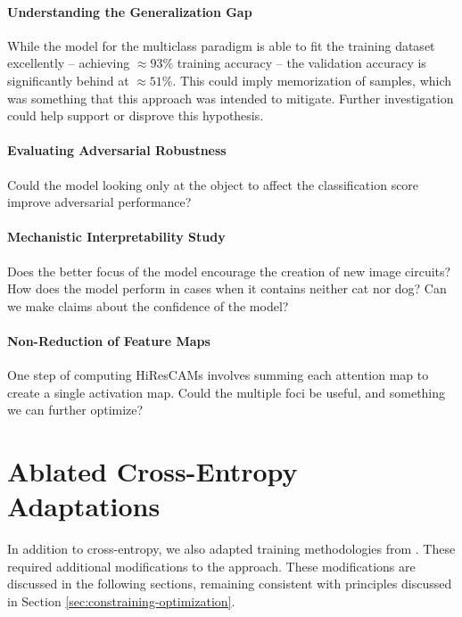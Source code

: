\documentclass{article}
\theoremstyle{plain}
\theoremstyle{definition}
\theoremstyle{remark}
\begin{document}
\paragraph{Understanding the Generalization Gap} While the model for the multiclass paradigm is able to fit the training dataset excellently -- achieving $\approx 93\%$ training accuracy -- the validation accuracy is significantly behind at $\approx 51\%$. This could imply memorization of samples, which was something that this approach was intended to mitigate. Further investigation could help support or disprove this hypothesis.

\paragraph{Evaluating Adversarial Robustness} Could the model looking only at the object to affect the classification score improve adversarial performance?

\paragraph{Mechanistic Interpretability Study} Does the better focus of the model encourage the creation of new image circuits? How does the model perform in cases when it contains neither cat nor dog? Can we make claims about the confidence of the model?

\paragraph{Non-Reduction of Feature Maps} One step of computing HiResCAMs involves summing each attention map to create a single activation map. Could the multiple foci be useful, and something we can further optimize?




\appendix

\section{Ablated Cross-Entropy Adaptations}

In addition to cross-entropy, we also adapted training methodologies from \citet{imagenetrecipe}. These required additional modifications to the approach. These modifications are discussed in the following sections, remaining consistent with principles discussed in Section \ref{sec:constraining-optimization}.
\end{document}
